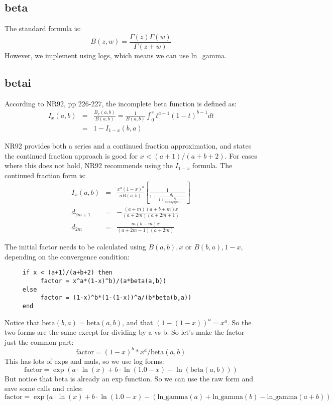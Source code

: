 \subsection*{beta}
The standard formula is:
\begin{equation}
  B(z,w) = \frac{\Gamma(z) \Gamma(w)}{\Gamma(z+w)}
\end{equation}
However, we implement using logs, which means we can use ln\_gamma.

\subsection*{betai}
According to NR92, pp 226-227,
the incomplete beta function is defined as:
\begin{eqnarray}
    I_x(a,b) & = & \frac{B_x(a,b)}{B(a,b)}
               = \frac{1}{B(a,b)}\int_0^xt^{a-1}(1-t)^{b-1}dt\\
             & = & 1 - I_{1-x}(b,a)
\end{eqnarray}

NR92 provides both a series and a continued fraction approximation,
and states the continued fraction approach is good for
$x < (a+1)/(a+b+2)$.  For cases where this does not hold, NR92
recommends using the $I_{1-x}$ formula.  The continued fraction
form is:
\begin{eqnarray}
  I_x(a,b) & = & \frac{x^a(1-x)^b}{aB(a,b)}
                 \left[ \frac{1}{\displaystyle 1
                        + \frac{d_1} {\displaystyle 1
                          + \frac{d_2} {displaystyle 1
                            + \cdots}}} \right]\\
  d_{2m+1} & = & -\frac{(a+m)(a+b+m)x} {(a+2m)(a+2m+1)}\\
  d_{2m}   & = & \frac{m(b-m)x}{(a+2m-1)(a+2m)}
\end{eqnarray}
  
The initial factor needs to be
calculated using $B(a,b),x$ or $B(b,a),1-x$, depending on the convergence
condition:
\begin{verbatim}
     if x < (a+1)/(a+b+2) then
          factor = x^a*(1-x)^b)/(a*beta(a,b))
     else
          factor = (1-x)^b*(1-(1-x))^a/(b*beta(b,a))
     end
\end{verbatim}

Notice that $\mbox{beta}(b,a)=\mbox{beta}(a,b)$, 
and that $(1-(1-x))^a = x^a$.
So the two forms are the same except for dividing by a vs b.
So let's make the factor just the common part:
\begin{equation}
  \mbox{factor} = (1-x)^b*x^a/\mbox{beta}(a,b)
\end{equation}
This has lots of exps and muls, so we use log forms:
\begin{equation}
  \mbox{factor} = \exp(a \cdot \ln(x)+b \cdot \ln(1.0-x)
      -\ln(\mbox{beta}(a,b)))
\end{equation}
But notice that beta is already an exp function.  So we can
use the raw form and save some calls and calcs:
\begin{equation}
  \mbox{factor} = \exp(a \cdot \ln(x) + b \cdot \ln(1.0-x)
          -(\mbox{ln\_gamma}(a)+\mbox{ln\_gamma}(b)-\mbox{ln\_gamma}(a+b))
\end{equation}

